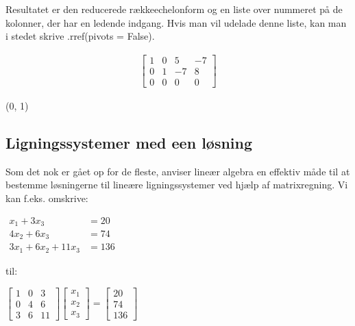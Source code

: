 \documentclass[letterpaper,10pt,english]{jupyterBook}
\begin{document}
Resultatet er den reducerede række\sphinxhyphen{}echelonform og en liste over nummeret på de kolonner, der har en ledende indgang. Hvis man vil udelade denne liste, kan man i stedet skrive .rref(pivots = False). 

\begin{sphinxVerbatim}[commandchars=\\\{\}]
\PYG{p}{[}\PYG{p}{]}
        \PYG{p}{[}\PYG{p}{]}
\end{sphinxVerbatim}
\begin{equation*}
\begin{split}\displaystyle \left[\begin{matrix}1 & 0 & 5 & -7\\0 & 1 & -7 & 8\\0 & 0 & 0 & 0\end{matrix}\right]\end{split}
\end{equation*}
\begin{sphinxVerbatim}[commandchars=\\\{\}]
(0, 1)
\end{sphinxVerbatim}


\subsection{Ligningssystemer med een løsning}
\label{\detokenize{notebooks/sympy/Notebook_LinAlg1_5:ligningssystemer-med-een-losning}}
Som det nok er gået op for de fleste, anviser lineær algebra en effektiv måde til at bestemme løsningerne til lineære ligningssystemer ved hjælp af matrixregning. Vi kan f.eks. omskrive:

\(\begin{aligned} x_1 + 3 x_3 &= 20 \\ 4x_2 + 6 x_3 &= 74 \\ 3 x_1 + 6x_2 + 11 x_3 &= 136 \end{aligned}\)

til:

\(\displaystyle \left[\begin{matrix}1 & 0 & 3\\0 & 4 & 6\\3 & 6 & 11\end{matrix}\right] \displaystyle \left[\begin{matrix}x_{1}\\x_{2}\\x_{3}\end{matrix}\right] = \displaystyle \left[\begin{matrix}20\\74\\136\end{matrix}\right]\)
\end{document}
